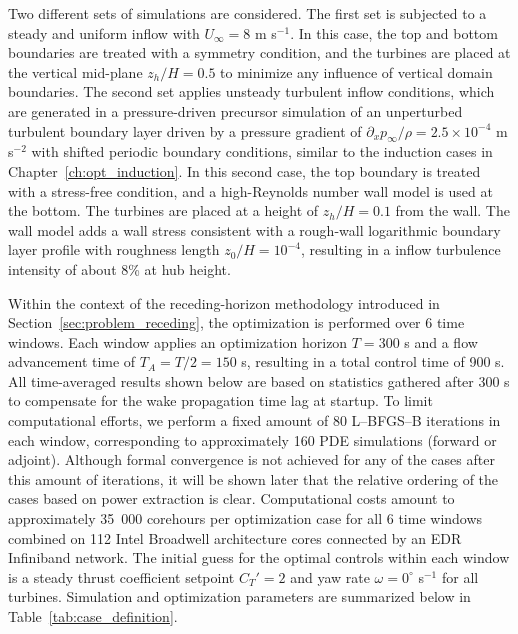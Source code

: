Two different sets of simulations are considered. The first set is subjected to a steady and uniform inflow with $U_\infty = 8$ m s$^{-1}$. In this case, the top and bottom boundaries are treated with a symmetry condition, and the turbines are placed at the vertical mid-plane $z_h/H = 0.5$ to minimize any influence of vertical domain boundaries. The second set applies unsteady turbulent inflow conditions, which are generated in a pressure-driven precursor simulation of an unperturbed turbulent boundary layer driven by a pressure gradient of $\partial_x p_\infty/\rho = 2.5 \times 10^{-4}$ m s$^{-2}$ with shifted periodic boundary conditions, similar to the induction cases in Chapter~\ref{ch:opt_induction}. In this second case, the top boundary is treated with a stress-free condition, and a high-Reynolds number wall model is used at the bottom. The turbines are placed at a height of $z_h/H = 0.1$ from the wall. The wall model adds a wall stress consistent with a rough-wall logarithmic boundary layer profile with roughness length $z_0/H = 10^{-4}$, resulting in a inflow turbulence intensity of about 8\% at hub height. 

Within the context of the receding-horizon methodology introduced in Section~\ref{sec:problem_receding}, the optimization is performed over 6 time windows. Each window applies an optimization horizon $T=300$ s and a flow advancement time of $T_A = T/2= 150$ s, resulting in a total control time of 900 s. All time-averaged results shown below are based on statistics gathered after 300 s to compensate for the wake propagation time lag at startup. To limit computational efforts, we perform a fixed amount of 80 L--BFGS--B iterations in each window, corresponding to approximately 160 PDE simulations (forward or adjoint). Although formal convergence is not achieved for any of the cases after this amount of iterations, it will be shown later that the relative ordering of the cases based on power extraction is clear. Computational costs amount to approximately 35~000 corehours per optimization case for all 6 time windows combined on 112 Intel Broadwell architecture cores connected by an EDR Infiniband network. The initial guess for the optimal controls within each window is a steady thrust coefficient setpoint $C_T'=2$  and yaw rate $\omega = 0^\circ$ s$^{-1}$ for all turbines. Simulation and optimization parameters are summarized below in Table~\ref{tab:case_definition}.

